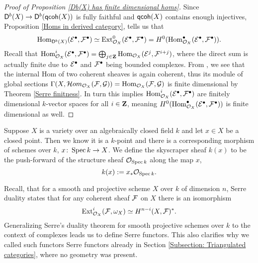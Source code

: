 
\begin{proof}[Proof of Proposition \ref{Db(X) has finite dimensional homs}]
    Since $\mathsf{D}^b(X) \to \mathsf{D}^b(\mathsf{qcoh}(X))$ is fully faithful and $\mathsf{qcoh}(X)$ contains enough injectives, Proposition \ref{Homs in derived category}, tells us that
    \[
        \operatorname{Hom}_{\mathsf{D}^b(X)}(\mathcal E^\bullet, \mathcal F^\bullet) \simeq \operatorname{Ext}^0_{{\mathcal{O}_{X}}}(\mathcal E^\bullet, \mathcal F^\bullet) = H^0(\operatorname{Hom}^\bullet_{{\mathcal{O}_{X}}}(\mathcal E^\bullet, \mathcal F^\bullet)).
    \]
    Recall that $\operatorname{Hom}^i_{{\mathcal{O}_{X}}}(\mathcal E^\bullet, \mathcal F^\bullet) = \bigoplus_{j \in \mathbf Z} \operatorname{Hom}_{{\mathcal{O}_{X}}}(\mathcal E^j, \mathcal F^{i+j})$, where the direct sum is actually finite due to $\mathcal E^\bullet$ and $\mathcal F^\bullet$ being bounded complexes. From \cite[\href{https://stacks.math.columbia.edu/tag/01CQ}{Tag 01CQ}]{stacks-project}, we see that the internal Hom of two coherent sheaves is again coherent, thus its module of global sections $\Gamma(X, \localhom_{\struct{X}}(\F, \G)) = \Hom_{\struct{X}}(\F, \G)$ is finite dimensional by Theorem \ref{Serre finitness}. In turn this implies $\operatorname{Hom}^i_{{\mathcal{O}_{X}}}(\mathcal E^\bullet, \mathcal F^\bullet)$ are finitely dimensional $k$-vector spaces for all $i \in \mathbf Z$, meaning $H^0(\operatorname{Hom}^\bullet_{{\mathcal{O}_{X}}}(\mathcal E^\bullet, \mathcal F^\bullet))$ is finite dimensional as well. 
\end{proof}


Suppose $X$ is a variety over an algebraically closed field $k$ and let $x \in X$ be a closed point. Then we know it is a $k$-point and there is a corresponding morphism of schemes over $k$, $x \colon \operatorname{Spec}k \to X$. We define the skyscraper sheaf $k(x)$ to be the push-forward of the structure sheaf ${\mathcal{O}_{\operatorname{Spec}k}}$ along the map $x$, 
\[
    k(x) := x_* {\mathcal{O}_{\operatorname{Spec}k}}.
\]

Recall, that for a smooth and projective scheme $X$ over $k$ of dimension $n$, Serre duality \cite[\S III, Theorem 7.6]{Hartshorne1977} states that for any coherent sheaf $\mathcal F$ on $X$ there is an isomorphism
\[
    \operatorname{Ext}_{{\mathcal{O}_{X}}}^i(\mathcal F, \omega_X) \simeq H^{n-i}(X, \mathcal F)^*.
\]
Generalizing Serre's duality theorem for smooth projective schemes over $k$ to the context of complexes leads us to define Serre functors. This also clarifies why we called such functors Serre functors already in Section \ref{Subsection: Triangulated categories}, where no geometry was present. 

